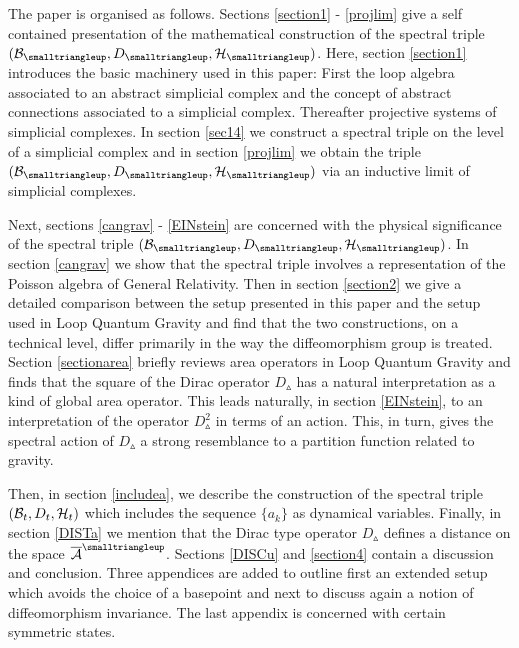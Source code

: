 \documentclass[12pt]{article}
\def\ca{{\cal A}}
\def\cb{{\cal B}}
\def\ch{{\cal H}}
\begin{document}
The paper is organised as follows. Sections \ref{section1} - \ref{projlim} give a self contained presentation of the mathematical construction of the spectral triple $(\cb_{\smalltriangleup},D_{\smalltriangleup},\ch_\smalltriangleup)$. Here, section \ref{section1} introduces the basic machinery used in this paper: First the loop algebra associated to an abstract simplicial complex and the concept of abstract connections associated to a simplicial complex. Thereafter projective systems of simplicial complexes. In section \ref{sec14} we construct a spectral triple on the level of a simplicial complex and in section \ref{projlim} we obtain the triple $(\cb_{\smalltriangleup},D_{\smalltriangleup},\ch_\smalltriangleup)$ via an inductive limit of simplicial complexes.

Next, sections \ref{cangrav} - \ref{EINstein} are concerned with the physical significance of the spectral triple $(\cb_{\smalltriangleup},D_{\smalltriangleup},\ch_\smalltriangleup)$. In section \ref{cangrav} we show that the spectral triple involves a representation of the Poisson algebra of General Relativity. Then in section \ref{section2} we give a detailed comparison between the setup presented in this paper and the setup used in Loop Quantum Gravity and find that the two constructions, on a technical level, differ primarily in the way the diffeomorphism group is treated. 
Section \ref{sectionarea} briefly reviews area operators in Loop Quantum Gravity and finds that the square of the Dirac operator $D_{\smalltriangleup}$ has a natural interpretation as a kind of global area operator. This leads naturally, in section \ref{EINstein}, to an interpretation of the operator $D_{\smalltriangleup}^2$ in terms of an action. This, in turn, gives the spectral action of $D_{\smalltriangleup}$ a strong resemblance to a partition function related to gravity.


Then, in section \ref{includea}, we describe the construction of the spectral triple $(\cb_t,D_t,\ch_t)$ which includes the sequence $\{a_k\}$ as dynamical variables. 
Finally, in section \ref{DISTa} we mention that the Dirac type operator $D_{\smalltriangleup}$ defines a distance on the space $\overline{\ca}^{\smalltriangleup}$. Sections 
\ref{DISCu} and \ref{section4} contain a discussion and conclusion. Three appendices are added to outline first an extended setup which avoids the choice of a basepoint and next to discuss again a notion of diffeomorphism invariance. The last appendix is concerned with certain symmetric states.
\end{document}
